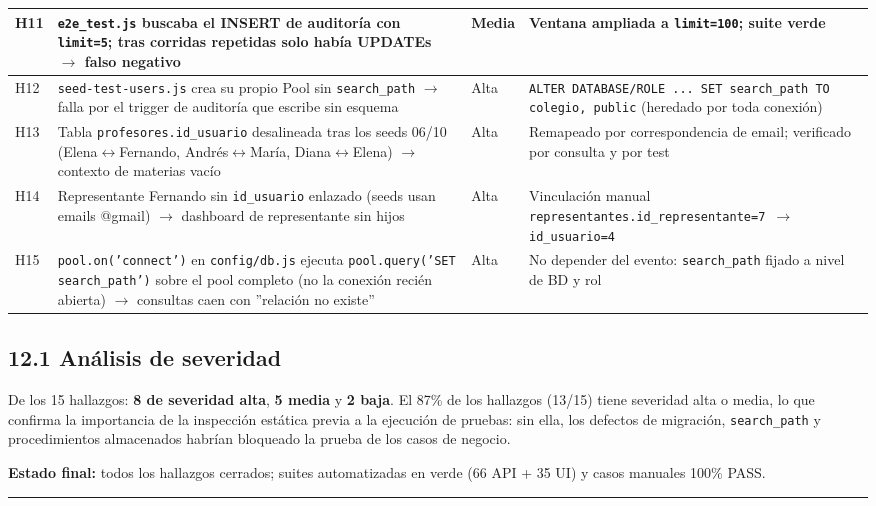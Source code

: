 \documentclass[11pt,a4paper]{article}
\begin{document}
{\begin{longtable}{|p{}|p{}|p{}|p{}|}
H11 & \texttt{e2e\_test.js} buscaba el INSERT de auditoría con \texttt{limit=5}; tras corridas repetidas solo había UPDATEs {$\rightarrow$} falso negativo & Media & Ventana ampliada a \texttt{limit=100}; suite verde \\ \hline
H12 & \texttt{seed-test-users.js} crea su propio Pool sin \texttt{search\_path} {$\rightarrow$} falla por el trigger de auditoría que escribe sin esquema & Alta & \texttt{ALTER DATABASE/ROLE ... SET search\_path TO colegio, public} (heredado por toda conexión) \\ \hline
H13 & Tabla \texttt{profesores.id\_usuario} desalineada tras los seeds 06/10 (Elena{$\leftrightarrow$}Fernando, Andrés{$\leftrightarrow$}María, Diana{$\leftrightarrow$}Elena) {$\rightarrow$} contexto de materias vacío & Alta & Remapeado por correspondencia de email; verificado por consulta y por test \\ \hline
H14 & Representante Fernando sin \texttt{id\_usuario} enlazado (seeds usan emails @gmail) {$\rightarrow$} dashboard de representante sin hijos & Alta & Vinculación manual \texttt{representantes.id\_representante=7 {$\rightarrow$} id\_usuario=4} \\ \hline
H15 & \texttt{pool.on('connect')} en \texttt{config/db.js} ejecuta \texttt{pool.query('SET search\_path')} sobre el pool completo (no la conexión recién abierta) {$\rightarrow$} consultas caen con ''relación no existe'' & Alta & No depender del evento: \texttt{search\_path} fijado a nivel de BD y rol \\ \hline
\end{longtable}}


\subsection*{12.1 Análisis de severidad}


De los 15 hallazgos: \textbf{8 de severidad alta}, \textbf{5 media} y \textbf{2 baja}. El 87\% de los hallazgos (13/15) tiene severidad alta o media, lo que confirma la importancia de la inspección estática previa a la ejecución de pruebas: sin ella, los defectos de migración, \texttt{search\_path} y procedimientos almacenados habrían bloqueado la prueba de los casos de negocio.


\textbf{Estado final:} todos los hallazgos cerrados; suites automatizadas en verde (66 API + 35 UI) y casos manuales 100\% PASS.


\hrule\vspace{0.4em}
\end{document}
